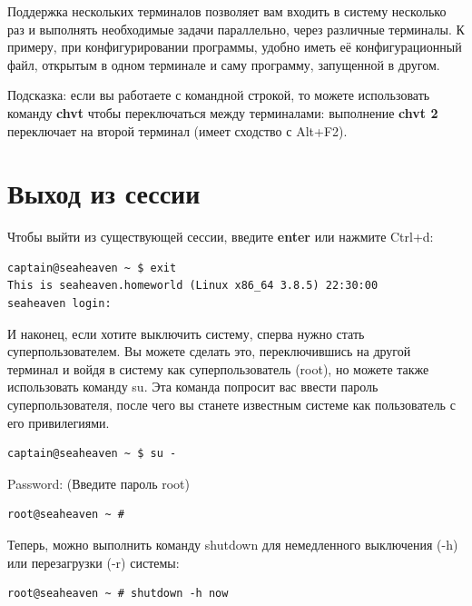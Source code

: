\documentclass[10pt]{book}
\begin{document}
Поддержка нескольких терминалов позволяет вам входить в систему несколько раз и выполнять необходимые задачи параллельно, через различные терминалы. К примеру, при конфигурировании программы, удобно иметь её конфигурационный файл, открытым в одном терминале и саму программу, запущенной в другом. 

Подсказка: если вы работаете с командной строкой, то можете использовать команду \textbf{chvt} чтобы переключаться между терминалами: выполнение \textbf{chvt 2} переключает на второй терминал (имеет сходство с Alt+F2).

\section{Выход из сессии}

Чтобы выйти из существующей сессии, введите \textbf{enter} или нажмите Ctrl+d:

\vspace{3mm}
\begin{tcolorbox}
\begin{lstlisting}
captain@seaheaven ~ $ exit
This is seaheaven.homeworld (Linux x86_64 3.8.5) 22:30:00
seaheaven login:
\end{lstlisting}
\end{tcolorbox}

И наконец, если хотите выключить систему, сперва нужно стать суперпользователем. Вы можете сделать это, переключившись на другой терминал и войдя в систему как суперпользователь (root), но можете также использовать команду su. Эта команда попросит вас ввести пароль суперпользователя, после чего вы станете известным системе как пользователь с его привилегиями. 

\vspace{3mm}
\begin{tcolorbox}
\begin{lstlisting}
captain@seaheaven ~ $ su -
\end{lstlisting}
Password: (Введите пароль root)
\begin{lstlisting}
root@seaheaven ~ #
\end{lstlisting}
\end{tcolorbox}

Теперь, можно выполнить команду shutdown для немедленного выключения (-h) или перезагрузки (-r) системы:

\vspace{3mm}
\begin{tcolorbox}
\begin{lstlisting}
root@seaheaven ~ # shutdown -h now
\end{lstlisting}
\end{tcolorbox}
\end{document}
